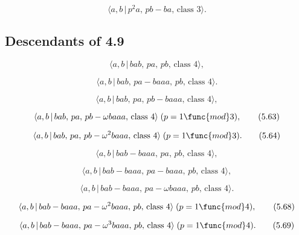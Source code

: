 \documentclass[10pt]{article}
\begin{document}
\begin{equation}
\langle a,b\,|\,p^{2}a,\,pb-ba,\,\text{class }3\rangle .  \tag{5.59}
\end{equation}

\subsection{Descendants of 4.9}

\begin{equation}
\langle a,b\,|\,bab,\,pa,\,pb,\,\text{class }4\rangle ,  \tag{5.60}
\end{equation}

\begin{equation}
\langle a,b\,|\,bab,\,pa-baaa,\,pb,\,\text{class }4\rangle .  \tag{5.61}
\end{equation}

\begin{equation}
\langle a,b\,|\,bab,\,pa,\,pb-baaa,\,\text{class }4\rangle ,  \tag{5.62}
\end{equation}

\begin{equation}
\langle a,b\,|\,bab,\,pa,\,pb-\omega baaa,\,\text{class }4\rangle \;(p=1%
\func{mod}3),  \tag{5.63}
\end{equation}

\begin{equation}
\langle a,b\,|\,bab,\,pa,\,pb-\omega ^{2}baaa,\,\text{class }4\rangle \;(p=1%
\func{mod}3).  \tag{5.64}
\end{equation}

\begin{equation}
\langle a,b\,|\,bab-baaa,\,pa,\,pb,\,\text{class }4\rangle ,  \tag{5.65}
\end{equation}

\begin{equation}
\langle a,b\,|\,bab-baaa,\,pa-baaa,\,pb,\,\text{class }4\rangle ,  \tag{5.66}
\end{equation}

\begin{equation}
\langle a,b\,|\,bab-baaa,\,pa-\omega baaa,\,pb,\,\text{class }4\rangle . 
\tag{5.67}
\end{equation}

\begin{equation}
\langle a,b\,|\,bab-baaa,\,pa-\omega ^{2}baaa,\,pb,\,\text{class }4\rangle
\;(p=1\func{mod}4),  \tag{5.68}
\end{equation}

\begin{equation}
\langle a,b\,|\,bab-baaa,\,pa-\omega ^{3}baaa,\,pb,\,\text{class }4\rangle
\;(p=1\func{mod}4).  \tag{5.69}
\end{equation}
\end{document}
